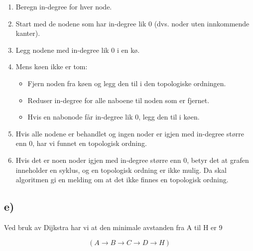 \documentclass[12pt]{article}
\begin{document}
\begin{enumerate}
    \item Beregn in-degree for hver node.
    \item Start med de nodene som har in-degree lik 0 (dvs. noder uten innkommende kanter).
    \item Legg nodene med in-degree lik 0 i en kø.
    \item Mens køen ikke er tom:
    \begin{itemize}
        \item Fjern noden fra køen og legg den til i den topologiske ordningen.
        \item Reduser in-degree for alle naboene til noden som er fjernet.
        \item Hvis en nabonode får in-degree lik 0, legg den til i køen.
    \end{itemize}
    \item Hvis alle nodene er behandlet og ingen noder er igjen med in-degree større enn 0, har vi funnet en topologisk ordning.
    \item Hvis det er noen noder igjen med in-degree større enn 0, betyr det at grafen inneholder en syklus, og en topologisk ordning er ikke mulig. Da skal algoritmen gi en melding om at det ikke finnes en topologisk ordning.
\end{enumerate}

\subsection*{e)}
Ved bruk av Dijkstra har vi at den minimale avstanden fra 
A til H er 9

\[\left(A\to B \to C \to D \to H\right)\]
\end{document}
